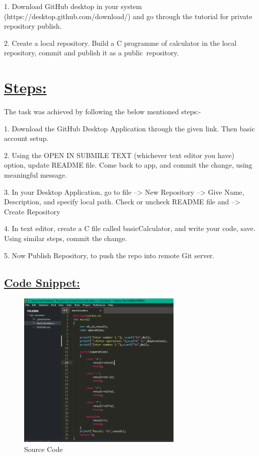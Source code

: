 \documentclass{article}
\begin{document}
1. Download GitHub desktop in your system (https://desktop.github.com/download/) and go through the tutorial for private repository publish. \vspace{0.2cm}
\newline

2. Create a local repository. Build a C programme of calculator in the local repository, commit and publish it as a public repository. \vspace{0.2cm}
\newline

\section{\underline{Steps:}}
The task was achieved by following the below mentioned steps:-
\newline

1. Download the GitHub Desktop Application through the given link. Then basic account setup. \vspace{0.5cm}

2. Using the OPEN IN SUBMILE TEXT (whichever text editor you have) option, update README file. Come back to app, and commit the change, using meaningful message. \vspace{0.5cm}

3. In your Desktop Application, go to file --> New Repository --> Give Name, Description, and specify local path. Check or uncheck README file and --> Create Repository \vspace{0.5cm}

4. In text editor, create a C file called basicCalculator, and write your code, save. Using similar steps, commit the change. \vspace{0.5cm}

5. Now Publish Repository, to push the repo into remote Git server. \vspace{0.5cm}

\newpage
\subsection{\underline{Code Snippet:}}

\begin{figure}[h!]
    \centering
    \includegraphics[width=0.7\textwidth]{calculator1.PNG}
    \caption{Source Code}
\end{figure}
\end{document}
